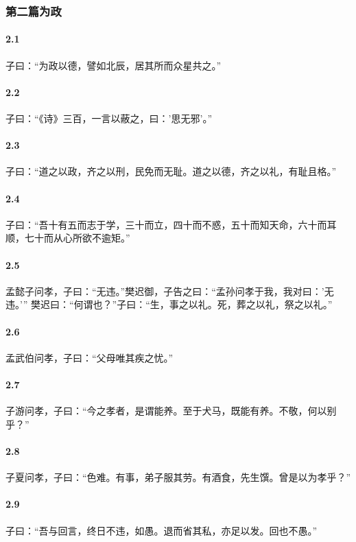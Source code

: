 \documentclass[main.tex]{subfiles}
\begin{document}
\subsubsection{第二篇为政}
\paragraph{2.1}
子曰：“为政以德，譬如北辰，居其所而众星共之。”

\paragraph{2.2}
子曰：“《诗》三百，一言以蔽之，曰：’思无邪’。”

\paragraph{2.3}
子曰：“道之以政，齐之以刑，民免而无耻。道之以德，齐之以礼，有耻且格。”

\paragraph{2.4}
子曰：“吾十有五而志于学，三十而立，四十而不惑，五十而知天命，六十而耳顺，七十而从心所欲不逾矩。”

\paragraph{2.5}
孟懿子问孝，子曰：“无违。”樊迟御，子告之曰：“孟孙问孝于我，我对曰：’无违。’”
樊迟曰：“何谓也？”子曰：“生，事之以礼。死，葬之以礼，祭之以礼。”

\paragraph{2.6}
孟武伯问孝，子曰：“父母唯其疾之忧。”

\paragraph{2.7}
子游问孝，子曰：“今之孝者，是谓能养。至于犬马，既能有养。不敬，何以别乎？”

\paragraph{2.8}
子夏问孝，子曰：“色难。有事，弟子服其劳。有酒食，先生馔。曾是以为孝乎？”

\paragraph{2.9}
子曰：“吾与回言，终日不违，如愚。退而省其私，亦足以发。回也不愚。”
\end{document}
